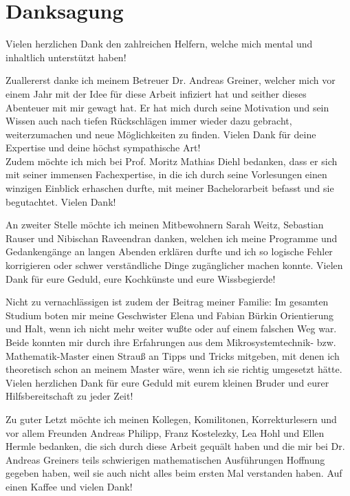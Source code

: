 \chapter{Danksagung}
Vielen herzlichen Dank den zahlreichen Helfern, welche mich mental und inhaltlich unterstützt haben!

Zuallererst danke ich meinem Betreuer Dr. Andreas Greiner, welcher mich vor einem Jahr mit der Idee für diese Arbeit infiziert hat und seither dieses Abenteuer mit mir gewagt hat. Er hat mich durch seine Motivation und sein Wissen auch nach tiefen Rückschlägen immer wieder dazu gebracht, weiterzumachen und neue Möglichkeiten zu finden. Vielen Dank für deine Expertise und deine höchst sympathische Art!\\
Zudem möchte ich mich bei Prof. Moritz Mathias Diehl bedanken, dass er sich mit seiner immensen Fachexpertise, in die ich durch seine Vorlesungen einen winzigen Einblick erhaschen durfte, mit meiner Bachelorarbeit befasst und sie begutachtet. Vielen Dank!

An zweiter Stelle möchte ich meinen Mitbewohnern Sarah Weitz, Sebastian Rauser und Nibischan Raveendran danken, welchen ich meine Programme und Gedankengänge an langen Abenden erklären durfte und ich so logische Fehler korrigieren oder schwer verständliche Dinge zugänglicher machen konnte. Vielen Dank für eure Geduld, eure Kochkünste und eure Wissbegierde!

Nicht zu vernachlässigen ist zudem der Beitrag meiner Familie: Im gesamten Studium boten mir meine Geschwister Elena und Fabian Bürkin Orientierung und Halt, wenn ich nicht mehr weiter wußte oder auf einem falschen Weg war. Beide konnten mir durch ihre Erfahrungen aus dem Mikrosystemtechnik- bzw. Mathematik-Master einen Strauß an Tipps und Tricks mitgeben, mit denen ich theoretisch schon an meinem Master wäre, wenn ich sie richtig umgesetzt hätte. Vielen herzlichen Dank für eure Geduld mit eurem kleinen Bruder und eurer Hilfsbereitschaft zu jeder Zeit!

Zu guter Letzt möchte ich meinen Kollegen, Komilitonen, Korrekturlesern und vor allem Freunden Andreas Philipp, Franz Kostelezky, Lea Hohl und Ellen Hermle bedanken, die sich durch diese Arbeit gequält haben und die mir bei Dr. Andreas Greiners teils schwierigen mathematischen Ausführungen Hoffnung gegeben haben, weil sie auch nicht alles beim ersten Mal verstanden haben. Auf einen Kaffee und vielen Dank!